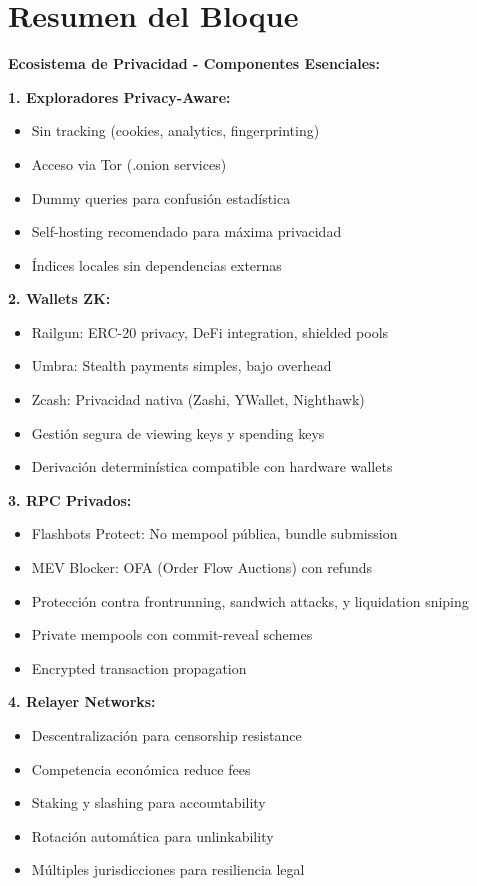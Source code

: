 \documentclass[11pt,a4paper,twoside]{book}
\theoremstyle{definition}
\theoremstyle{remark}
\begin{document}
\section*{Resumen del Bloque}

\begin{keyidea}
\textbf{Ecosistema de Privacidad - Componentes Esenciales:}

\textbf{1. Exploradores Privacy-Aware:}
\begin{itemize}
    \item Sin tracking (cookies, analytics, fingerprinting)
    \item Acceso via Tor (.onion services)
    \item Dummy queries para confusión estadística
    \item Self-hosting recomendado para máxima privacidad
    \item Índices locales sin dependencias externas
\end{itemize}

\textbf{2. Wallets ZK:}
\begin{itemize}
    \item Railgun: ERC-20 privacy, DeFi integration, shielded pools
    \item Umbra: Stealth payments simples, bajo overhead
    \item Zcash: Privacidad nativa (Zashi, YWallet, Nighthawk)
    \item Gestión segura de viewing keys y spending keys
    \item Derivación determinística compatible con hardware wallets
\end{itemize}

\textbf{3. RPC Privados:}
\begin{itemize}
    \item Flashbots Protect: No mempool pública, bundle submission
    \item MEV Blocker: OFA (Order Flow Auctions) con refunds
    \item Protección contra frontrunning, sandwich attacks, y liquidation sniping
    \item Private mempools con commit-reveal schemes
    \item Encrypted transaction propagation
\end{itemize}

\textbf{4. Relayer Networks:}
\begin{itemize}
    \item Descentralización para censorship resistance
    \item Competencia económica reduce fees
    \item Staking y slashing para accountability
    \item Rotación automática para unlinkability
    \item Múltiples jurisdicciones para resiliencia legal
\end{itemize}


\end{keyidea}
\end{document}
